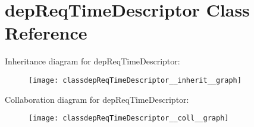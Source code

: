 \hypertarget{classdepReqTimeDescriptor}{}\section{dep\+Req\+Time\+Descriptor Class Reference}
\label{classdepReqTimeDescriptor}


Inheritance diagram for dep\+Req\+Time\+Descriptor\+:\nopagebreak
\begin{figure}[H]
\begin{center}
\leavevmode
\texttt{[image: classdepReqTimeDescriptor\_\_inherit\_\_graph]}
\end{center}
\end{figure}


Collaboration diagram for dep\+Req\+Time\+Descriptor\+:\nopagebreak
\begin{figure}[H]
\begin{center}
\leavevmode
\texttt{[image: classdepReqTimeDescriptor\_\_coll\_\_graph]}
\end{center}
\end{figure}
